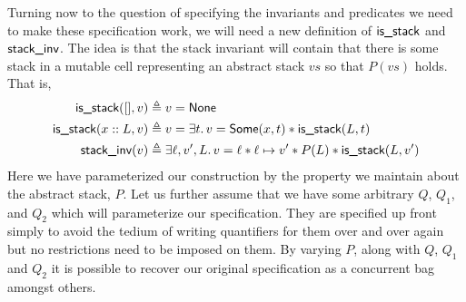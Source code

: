 Turning now to the question of specifying the invariants and
predicates we need to make these specification work, we will need a
new definition of $\textsf{is\_stack}$ and
$\textsf{stack\_inv}$. The idea is that the stack invariant will
contain that there is some stack in a mutable cell representing an
abstract stack $vs$ so that $P(vs)$ holds. That is,
\begin{align*}
  \textlog{is\_stack}([], v) &\triangleq v = \textlog{None}\\
  \textlog{is\_stack}(x :: L, v) &\triangleq v =
  \Exists t. v = \textlog{Some}(x, t) * \textlog{is\_stack}(L, t)\\
  \textlog{stack\_inv}(v) &\triangleq
  \Exists \ell, v', L. v = \ell * \ell \mapsto v' * P(L) * \textlog{is\_stack}(L, v')
\end{align*}
Here we have parameterized our construction by the property we
maintain about the abstract stack, $P$. Let us further assume that we
have some arbitrary $Q$, $Q_1$, and $Q_2$ which will parameterize our
specification. They are specified up front simply to avoid the tedium
of writing quantifiers for them over and over again but no
restrictions need to be imposed on them. By varying $P$, along with
$Q$, $Q_1$ and $Q_2$ it is possible to recover our original
specification as a concurrent bag amongst others.

